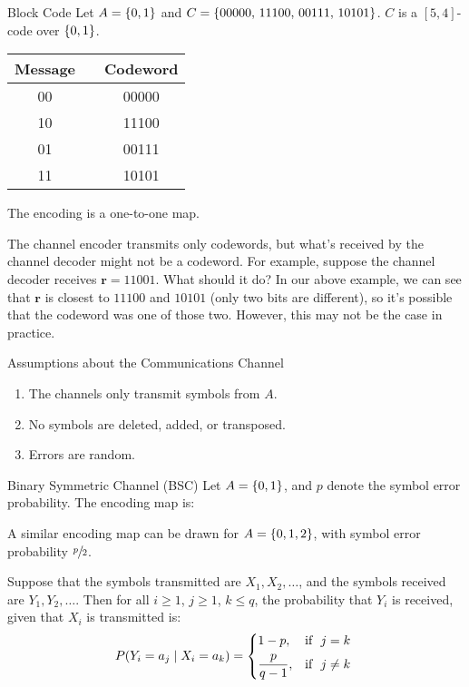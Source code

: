\begin{Example}{Block Code}{}
    Let $ A=\{0,1\} $ and $ C=\{00000,\,11100,\,00111,\,10101\} $.
    $ C $ is a $ [5,4] $-code over $ \{0,1\} $.
    \begin{table}[H]
        \centering
        \begin{tabular}{@{}ccc@{}}
            Message & \textrightarrow{} & Codeword \\
            \midrule
            00      & \textrightarrow{} & 00000    \\
            10      & \textrightarrow{} & 11100    \\
            01      & \textrightarrow{} & 00111    \\
            11      & \textrightarrow{} & 10101    \\
        \end{tabular}
    \end{table}
    The encoding is a one-to-one map.
\end{Example}

The channel encoder transmits only codewords, but what's received by the channel
decoder might not be a codeword. For example, suppose the channel decoder
receives $ \bm{r}=11001 $. What should it do? In our above example, we can see
that $ \bm{r} $ is closest to $ 11100 $ and $ 10101 $ (only two bits are different),
so it's possible that the codeword was one of those two. However,
this may not be the case in practice.

\begin{Definition}{Assumptions about the Communications Channel}{}
    \begin{enumerate}[label=(\Roman*)]
        \item The channels only transmit symbols from $ A $.
        \item No symbols are deleted, added, or transposed.
        \item Errors are random.
    \end{enumerate}
\end{Definition}

\begin{Example}{Binary Symmetric Channel (BSC)}{}
    Let $ A=\{0,1\} $, and $ p $ denote the symbol error probability.
    The encoding map is:
    \begin{center}
        
    \end{center}
    A similar encoding map can be drawn for $ A=\{0,1,2\} $,
    with symbol error probability $ \sfrac{p}{2} $.

    Suppose that the symbols transmitted are $ X_1,X_2,\ldots $,
    and the symbols received are $ Y_1,Y_2,\ldots $. Then for all
    $ i\geqslant 1 $, $ j\geqslant 1 $, $ k\leqslant q $, the probability
    that $ Y_i $ is received, given that $ X_i $ is transmitted is:
    \[ P(Y_i=a_j\mid X_i=a_k)=
        \begin{dcases*}
            1-p,            & \text{if } $ j=k $     \\
            \frac{p}{q-1}, & \text{if } $ j\neq{}k $
        \end{dcases*} \]
\end{Example}

